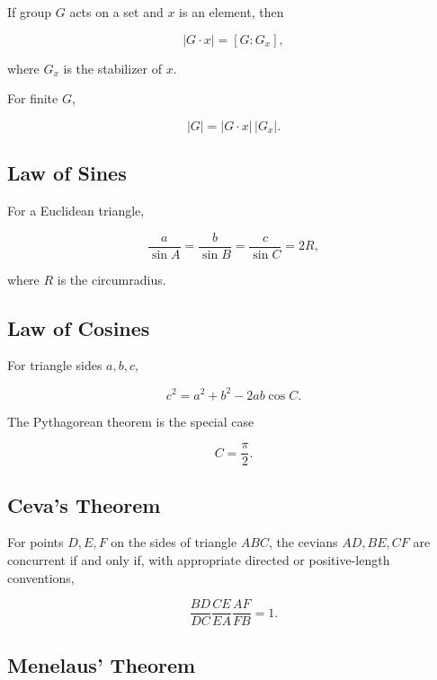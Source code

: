 If group \(G\) acts on a set and \(x\) is an element, then

\[
\boxed{
|G\cdot x|
=
[G:G_x],
}
\]

where \(G_x\) is the stabilizer of \(x\).

For finite \(G\),

\[
\boxed{
|G|
=
|G\cdot x|
\,|G_x|.
}
\]

\subsection{Law of Sines}
\label{subsec:law-sines-theorem-summary}

For a Euclidean triangle,

\[
\boxed{
\frac{a}{\sin A}
=
\frac{b}{\sin B}
=
\frac{c}{\sin C}
=
2R,
}
\]

where \(R\) is the circumradius.

\subsection{Law of Cosines}
\label{subsec:law-cosines-theorem-summary}

For triangle sides \(a,b,c\),

\[
\boxed{
c^2
=
a^2+b^2-2ab\cos C.
}
\]

The Pythagorean theorem is the special case

\[
C=\frac{\pi}{2}.
\]

\subsection{Ceva's Theorem}
\label{subsec:ceva-summary}

For points \(D,E,F\) on the sides of triangle \(ABC\), the cevians
\(AD,BE,CF\) are concurrent if and only if, with appropriate directed or
positive-length conventions,

\[
\boxed{
\frac{BD}{DC}
\frac{CE}{EA}
\frac{AF}{FB}
=
1.
}
\]

\subsection{Menelaus' Theorem}
\label{subsec:menelaus-summary}

